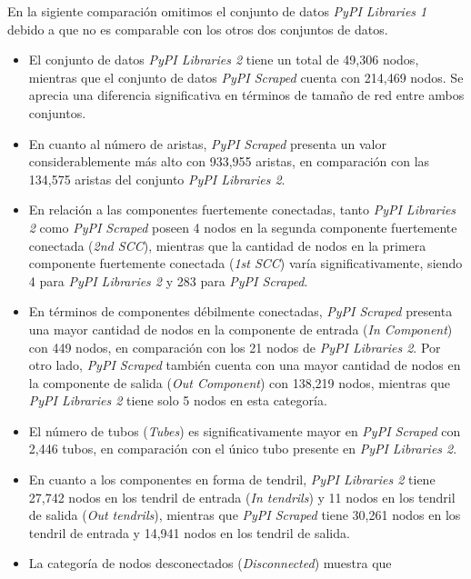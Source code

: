 En la sigiente comparación omitimos el conjunto de datos \textit{PyPI Libraries 1} debido a que no es comparable con los otros dos conjuntos de datos.

\begin{itemize}
    \item El conjunto de datos \textit{PyPI Libraries 2} tiene un total de 49,306 nodos,
          mientras que el conjunto de datos \textit{PyPI Scraped} cuenta con 214,469 nodos.
          Se aprecia una diferencia significativa en términos de tamaño de red entre ambos conjuntos.
    \item En cuanto al número de aristas, \textit{PyPI Scraped} presenta un valor
          considerablemente más alto con 933,955 aristas, en comparación con las 134,575
          aristas del conjunto \textit{PyPI Libraries 2}.
    \item En relación a las componentes fuertemente conectadas, tanto \textit{PyPI Libraries 2}
          como \textit{PyPI Scraped} poseen 4 nodos en la segunda componente fuertemente
          conectada (\textit{2nd SCC}), mientras que la cantidad de nodos en la primera
          componente fuertemente conectada (\textit{1st SCC}) varía significativamente,
          siendo 4 para \textit{PyPI Libraries 2} y 283 para \textit{PyPI Scraped}.
    \item En términos de componentes débilmente conectadas, \textit{PyPI Scraped}
          presenta una mayor cantidad de nodos en la componente de entrada (\textit{In Component})
          con 449 nodos, en comparación con los 21 nodos de \textit{PyPI Libraries 2}. Por otro
          lado, \textit{PyPI Scraped} también cuenta con una mayor cantidad de nodos en la
          componente de salida (\textit{Out Component}) con 138,219 nodos, mientras que
          \textit{PyPI Libraries 2} tiene solo 5 nodos en esta categoría.
    \item El número de tubos (\textit{Tubes}) es significativamente mayor en
          \textit{PyPI Scraped} con 2,446 tubos, en comparación con el único tubo presente
          en \textit{PyPI Libraries 2}.
    \item En cuanto a los componentes en forma de tendril, \textit{PyPI Libraries 2} tiene
          27,742 nodos en los tendril de entrada (\textit{In tendrils}) y 11 nodos en los
          tendril de salida (\textit{Out tendrils}), mientras que \textit{PyPI Scraped} tiene
          30,261 nodos en los tendril de entrada y 14,941 nodos en los tendril de salida.
    \item La categoría de nodos desconectados (\textit{Disconnected}) muestra que

\end{itemize}
